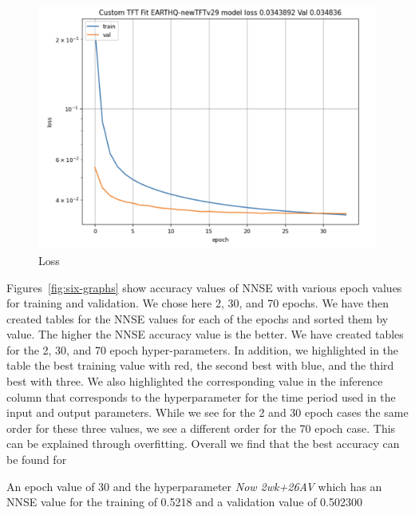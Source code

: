 \documentclass[utf8]{FrontiersinVancouver} %
\newcommand{\TODO}[1]{\todo[inline]{#1}}
\begin{document}
\begin{figure}[htb]
    \centering
    \includegraphics[width=0.70\columnwidth]{images/loss.png}
    \caption{Loss}
    \label{fig:loss}
\end{figure}

Figures~\ref{fig:six-graphs} show accuracy values of NNSE with
various epoch values for training and validation. We chose here 2, 30,
and 70 epochs.  We have then created tables for the NNSE values for
each of the epochs and sorted them by value. The higher the NNSE
accuracy value is the better. We have created tables for the 2, 30,
and 70 epoch hyper-parameters. In addition, we highlighted in the table
the best training value with red, the second best with blue, and the
third best with three. We also highlighted the corresponding value in
the inference column that corresponds to the hyperparameter for the
time period used in the input and output parameters. While we see for
the 2 and 30 epoch cases the same order for these three values, we see
a different order for the 70 epoch case. This can be explained through
overfitting. Overall we find that the best accuracy can be found for

An epoch value of 30  and the hyperparameter {\em Now 2wk+26AV} which has an NNSE value for the training of 
0.5218 and a validation value of 0.502300 

\TODO{what is Now 2wk+26AV}
\end{document}
